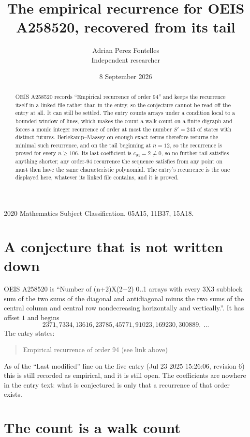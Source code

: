 \documentclass[11pt,a4paper]{article}
\title{The empirical recurrence for OEIS A258520, recovered from its tail}
\author{Adrian Perez Fontelles\\ \small Independent researcher}
\date{8 September 2026}
\theoremstyle{plain}
\theoremstyle{definition}
\begin{document}
\maketitle

\begin{abstract}
OEIS A258520 records ``Empirical recurrence of order $94$'' and keeps the recurrence itself in
a linked file rather than in the entry, so the conjecture cannot be read off the entry at all.
It can still be settled. The entry counts arrays under a condition local to a bounded window of
lines, which makes the count a walk count on a finite digraph and forces a monic integer
recurrence of order at most the number $S'=243$ of states with distinct futures. Berlekamp--Massey on
enough exact terms therefore returns the minimal such recurrence, and on the tail beginning at $n=12$, so the recurrence is proved for every $n\ge106$.
Its last coefficient is $c_{94}=2\neq0$, so no further tail satisfies anything
shorter; any order-$94$ recurrence the sequence satisfies from any point on must then have
the same characteristic polynomial. The entry's recurrence is the one displayed here, whatever
its linked file contains, and it is proved.
\end{abstract}

\noindent\small 2020 Mathematics Subject Classification. 05A15, 11B37, 15A18.\normalsize

\section{A conjecture that is not written down}

OEIS A258520 is ``Number of (n+2)X(2+2) 0..1 arrays with every 3X3 subblock sum of the two sums of the diagonal and antidiagonal minus the two sums of the central column and central row nondecreasing horizontally and vertically.''. It has offset $1$ and begins
\[
2371, 7334, 13616, 23785, 45771, 91023, 169230, 300889,\ \dots
\]
The entry states:
\begin{quote}
Empirical recurrence of order 94 (see link above)
\end{quote}
As of the ``Last modified'' line on the live entry (Jul 23 2025 15:26:06, revision 6)
this is still recorded as empirical, and it is still open. The coefficients are nowhere in the
entry text: what is conjectured is only that a recurrence of that order exists.

\section{The count is a walk count}
\end{document}
